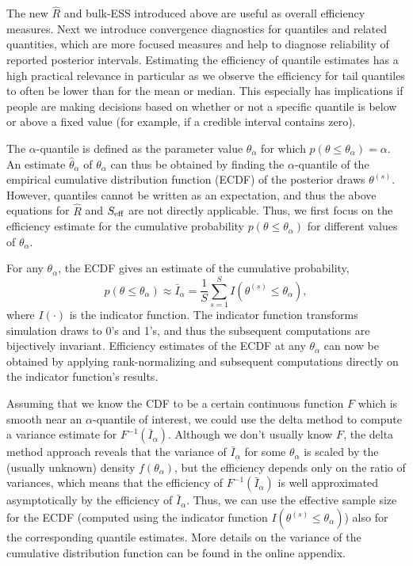 \documentclass[american,]{article}
\theoremstyle{definition}
\begin{document}
The new \(\widehat{R}\) and bulk-ESS introduced above are useful as overall efficiency
measures. Next we introduce
convergence diagnostics for quantiles and related quantities, which are more focused measures and help to diagnose reliability of  reported
posterior intervals. Estimating
the efficiency of quantile estimates has a high practical
relevance in particular as we observe the efficiency for tail quantiles
to often be lower than for the mean or median.  This especially has implications
if people are making decisions based on whether or not a specific quantile
is below or above a fixed value (for example, if a credible interval contains zero).

The \(\alpha\)-quantile
is defined as the parameter value \(\theta_\alpha\) for which
\(p(\theta \leq \theta_\alpha) = \alpha\). An estimate
\(\hat{\theta}_\alpha\) of \(\theta_\alpha\) can thus be obtained by
finding the \(\alpha\)-quantile of the empirical cumulative distribution function (ECDF) of the
posterior draws \(\theta^{(s)}\). However, quantiles cannot be written
as an expectation, and thus the above equations for \(\widehat{R}\) and
\(S_{\rm eff}\) are not directly applicable. Thus, we first focus on the
efficiency estimate for the cumulative probability
\(p(\theta \leq \theta_\alpha)\) for different values of
\(\theta_\alpha\).

For any \(\theta_\alpha\), the ECDF gives an estimate of the cumulative
probability,
\begin{equation}
p(\theta \leq \theta_\alpha) \approx \bar{I}_\alpha = \frac{1}{S}\sum_{s=1}^S
I(\theta^{(s)} \leq\theta_\alpha),
\end{equation}
where \(I(\cdot)\) is the indicator function. The indicator function
transforms simulation draws to 0's and 1's, and thus the subsequent
computations are bijectively invariant. Efficiency estimates of the ECDF
at any \(\theta_\alpha\) can now be obtained by applying
rank-normalizing and subsequent computations directly on the indicator
function's results.

Assuming that we know the CDF to be a certain continuous function \(F\)
which is smooth near an \(\alpha\)-quantile of interest, we could use
the delta method to compute a variance estimate for
\(F^{-1}(\bar{I}_\alpha)\). Although we don't usually know \(F\), the
delta method approach reveals that the variance of \(\bar{I}_\alpha\)
for some \(\theta_\alpha\) is scaled by the (usually unknown) density
\(f(\theta_\alpha)\), but the efficiency depends only on the ratio of variances, which means that the efficiency of \(F^{-1}(\bar{I}_\alpha)\) is well approximated asymptotically by the  efficiency
of \(\bar{I}_\alpha\). Thus, we can use the effective sample size for
the ECDF (computed using the indicator function
\(I(\theta^{(s)} \leq \theta_\alpha)\)) also for the corresponding
quantile estimates. More details on the variance of the cumulative
distribution function can be found in the online appendix.
\end{document}
